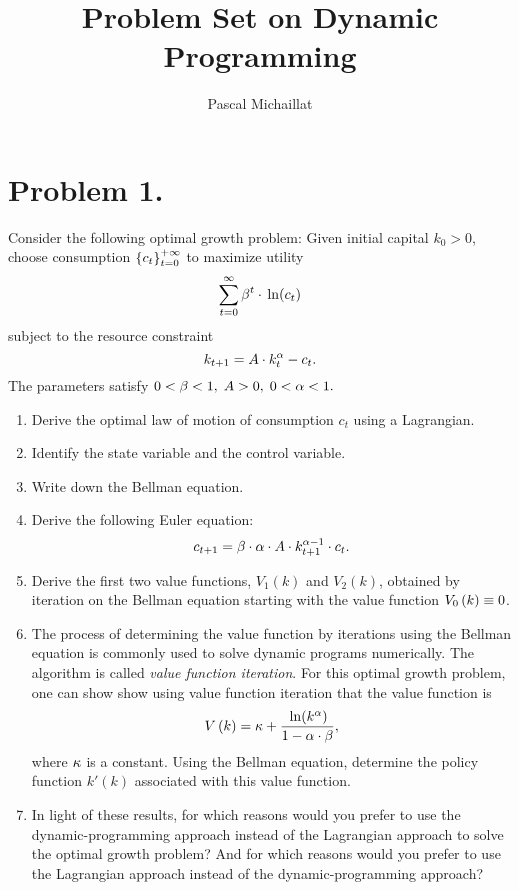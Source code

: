 \documentclass[letterpaper,12pt,leqno]{article}
\begin{document}
\title{Problem Set on Dynamic Programming}
\author{Pascal Michaillat}
\date{}

\begin{titlepage}
\maketitle
\end{titlepage}

\section*{Problem 1.}

Consider the following optimal growth problem: Given initial capital $k_{0}>0$, choose consumption $\left\lbrace c_{t} \right\rbrace _{t =0}^{+\infty}$ to maximize utility
\begin{equation*}
\sum_{t=0}^{\infty}\b ^{t}\cdot \ln{c_{t}}
\end{equation*}
subject to the resource constraint
\begin{equation*}
k_{t+1}=A\cdot k_{t}^{\alpha}-c_{t}.
\end{equation*}
The parameters satisfy $0<\beta<1,\;A>0,\;0<\alpha <1.$

\begin{enumerate}
\item Derive the optimal law of motion of consumption $c_{t}$ using a Lagrangian.
\item Identify the state variable and the control variable. 
\item Write down the Bellman equation.
\item Derive the following Euler equation: 
\begin{equation*}
c_{t+1}=\beta\cdot  \alpha\cdot  A\cdot k_{t+1}^{\alpha -1}\cdot c_{t}.
\end{equation*}

\item Derive the first two value functions, $V_{1}(k)$ and  $V_{2}(k)$, obtained by iteration on the Bellman equation starting with the value function $V_{0}\left( k \right) \equiv 0$. 
\item The process of determining the value function by iterations using the Bellman equation is commonly used to solve dynamic programs numerically. The algorithm is called \textit{value function iteration}. For this optimal growth problem, one can show show using value function iteration that the value function is
\[V\bp{k} =\kappa +\frac{\ln{k^{\a}}}{1-\a\cdot \b},\]
where $\kappa$ is a constant. Using the Bellman equation, determine the policy function $k'(k)$ associated with this value function.
\item In light of these results, for which reasons would you prefer to use the dynamic-programming approach instead of the Lagrangian approach to solve the optimal growth problem? And for which reasons would you prefer to use the Lagrangian approach instead of the dynamic-programming approach?
\end{enumerate}
\end{document}
